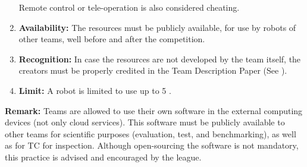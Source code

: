 \begin{enumerate}
	  Remote control or tele-operation is also considered cheating. 
	\item \textbf{Availability:} The resources must be publicly available, for use by robots of other teams, well before and after the competition.
	\item \textbf{Recognition:} In case the resources are not developed by the team itself, the creators must be properly credited in the Team Description Paper (See ).
	\item \textbf{Limit:} A robot is limited to use up to 5 . 
\end{enumerate}

\textbf{Remark:} Teams are allowed to use their own software in the external computing devices (not only cloud services). This software must be publicly available to other teams for scientific purposes (evaluation, test, and benchmarking), as well as for TC for inspection. Although open-sourcing the software is not mandatory, this practice is advised and encouraged by the league.

 
